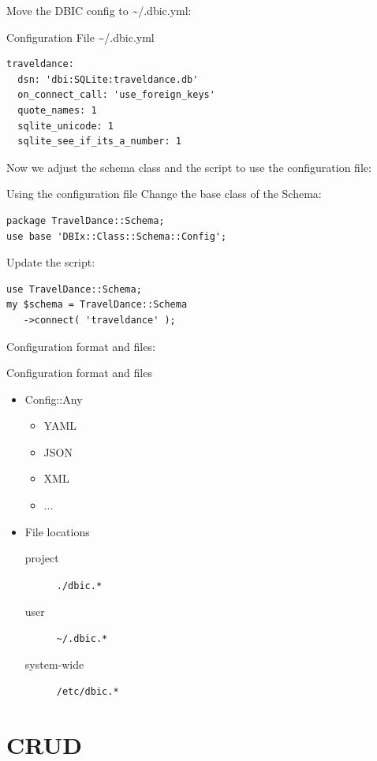 Move the DBIC config to \textasciitilde/.dbic.yml:

\begin{frame}[fragile]{Configuration File \textasciitilde/.dbic.yml}
\begin{lstlisting}
traveldance:
  dsn: 'dbi:SQLite:traveldance.db'
  on_connect_call: 'use_foreign_keys'
  quote_names: 1
  sqlite_unicode: 1
  sqlite_see_if_its_a_number: 1
\end{lstlisting}
\end{frame}

Now we adjust the schema class and the script to use
the configuration file:

\begin{frame}[fragile]{Using the configuration file}
Change the base class of the Schema:

\begin{lstlisting}
package TravelDance::Schema;
use base 'DBIx::Class::Schema::Config';
\end{lstlisting}

Update the script:

\begin{lstlisting}
use TravelDance::Schema;
my $schema = TravelDance::Schema
   ->connect( 'traveldance' );
\end{lstlisting}
\end{frame}

Configuration format and files:

\begin{frame}[fragile]{Configuration format and files}
\begin{itemize}
\item Config::Any
\begin{itemize}
\item YAML
\item JSON
\item XML
\item ...
\end{itemize}
\item File locations
\begin{description}
\item[project] \verb|./dbic.*|
\item[user] \verb|~/.dbic.*|
\item[system-wide] \verb|/etc/dbic.*|
\end{description}
\end{itemize}
\end{frame}

\section{CRUD}

